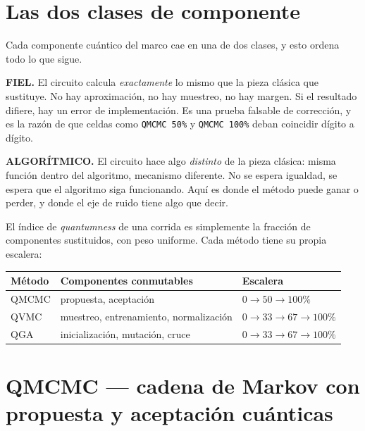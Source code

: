 \documentclass[11pt,a4paper]{article}
\newcommand{\Cu}[1]{\textcolor{cuantico}{\textbf{#1}}}
\newcommand{\Fi}[1]{\textcolor{fiel}{\textbf{#1}}}
\begin{document}
\section{Las dos clases de componente}

Cada componente cuántico del marco cae en una de dos clases, y esto ordena
todo lo que sigue.

\medskip
\noindent
\Fi{FIEL.} El circuito calcula \emph{exactamente} lo mismo que la pieza
clásica que sustituye. No hay aproximación, no hay muestreo, no hay margen.
Si el resultado difiere, hay un error de implementación. Es una prueba
falsable de corrección, y es la razón de que celdas como
\texttt{QMCMC 50\%} y \texttt{QMCMC 100\%} deban coincidir dígito a
dígito.

\medskip
\noindent
\Cu{ALGORÍTMICO.} El circuito hace algo \emph{distinto} de la pieza clásica:
misma función dentro del algoritmo, mecanismo diferente. No se espera
igualdad, se espera que el algoritmo siga funcionando. Aquí es donde el
método puede ganar o perder, y donde el eje de ruido tiene algo que decir.

\medskip
El índice de \emph{quantumness} de una corrida es simplemente la fracción de
componentes sustituidos, con peso uniforme. Cada método tiene su propia
escalera:

\begin{center}
\small
\begin{tabular}{lll}
\toprule
\textbf{Método} & \textbf{Componentes conmutables} & \textbf{Escalera} \\
\midrule
QMCMC & propuesta, aceptación & $0 \to 50 \to 100\%$ \\
QVMC  & muestreo, entrenamiento, normalización & $0 \to 33 \to 67 \to 100\%$ \\
QGA   & inicialización, mutación, cruce & $0 \to 33 \to 67 \to 100\%$ \\
\bottomrule
\end{tabular}
\end{center}

\section{QMCMC — cadena de Markov con propuesta y aceptación cuánticas}
\end{document}
